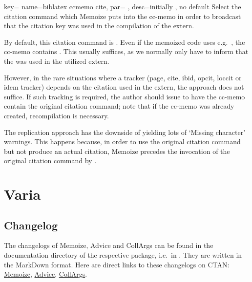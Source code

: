 \documentclass[a4paper,11pt]{article}
\begin{document}
\begin{doc}{
    key={
      name=biblatex ccmemo cite,
      par={%
      },
      desc={initially , no default}
    }
  }
  Select the citation command which Memoize puts into the cc-memo in order to
  broadcast that the citation key was used in the compilation of the extern.

  By default, this citation command is .  Even if the memoized code
  uses e.g.\ , the cc-memo contains
  .  This usually suffices, as we
  normally only have to inform  that the  was
  used in the utilized extern.

  However, in the rare situations where a tracker (page, cite, ibid, opcit,
  loccit or idem tracker) depends on the citation used in the extern, the
   approach does not suffice.  If such tracking is required, the
  author should issue  to have the cc-memo contain the original citation
  command; note that if the cc-memo was already created, recompilation is
  necessary.

  The replication approach has the downside of yielding lots of `Missing
  character' warnings.  This happens because, in order to use the original
  citation command but not produce an actual citation, Memoize precedes the
  invocation of the original citation command by .
\end{doc}

\section{Varia}

\subsectionclearpagefalse


\subsection{Changelog}

The changelogs of Memoize, Advice and CollArgs can be found in the
documentation directory of the respective package, i.e.\ in
.  They are written
in the MarkDown format.  Here are direct links to these changelogs on
CTAN:
\href{https://mirrors.ctan.org/macros/generic/memoize/CHANGELOG.md}{Memoize},
\href{https://mirrors.ctan.org/macros/generic/advice/CHANGELOG.md}{Advice},
\href{https://mirrors.ctan.org/macros/generic/collargs/CHANGELOG.md}{CollArgs}.
\end{document}
